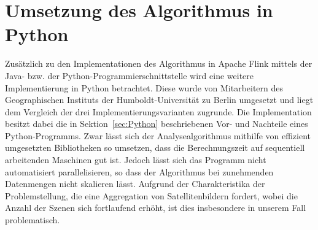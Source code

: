\section{Umsetzung des Algorithmus in Python}
Zusätzlich zu den Implementationen des Algorithmus in Apache Flink mittels der Java- bzw. der Python-Programmierschnittstelle wird eine weitere Implementierung in Python betrachtet. Diese wurde von Mitarbeitern des Geographischen Instituts der Humboldt-Universität zu Berlin umgesetzt und liegt dem Vergleich der drei Implementierungsvarianten zugrunde. Die Implementation besitzt dabei die in Sektion~\ref{sec:Python} beschriebenen Vor- und Nachteile eines Python-Programms. Zwar lässt sich der Analysealgorithmus mithilfe von effizient umgesetzten Bibliotheken so umsetzen, dass die Berechnungszeit auf sequentiell arbeitenden Maschinen gut ist. Jedoch lässt sich das Programm nicht automatisiert parallelisieren, so dass der Algorithmus bei zunehmenden Datenmengen nicht skalieren lässt. Aufgrund der Charakteristika der Problemstellung, die eine Aggregation von Satellitenbildern fordert, wobei die Anzahl der Szenen sich fortlaufend erhöht, ist dies insbesondere in unserem Fall problematisch.
\newline


